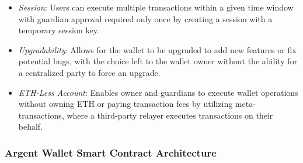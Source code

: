 \begin{itemize}
    \item \textit{Session}: Users can execute multiple transactions within a given time window with guardian approval required only once by creating a session with a temporary session key.
    \item \textit{Upgradability}: Allows for the wallet to be upgraded to add new features or fix potential bugs, with the choice left to the wallet owner without the ability for a centralized party to force an upgrade.
    \item \textit{ETH-Less Account}: Enables owner and guardians to execute wallet operations without owning ETH or paying transaction fees by utilizing meta-transactions, where a third-party relayer executes transactions on their behalf.
    \end{itemize}
    
\subsubsection{Argent Wallet Smart Contract Architecture}

